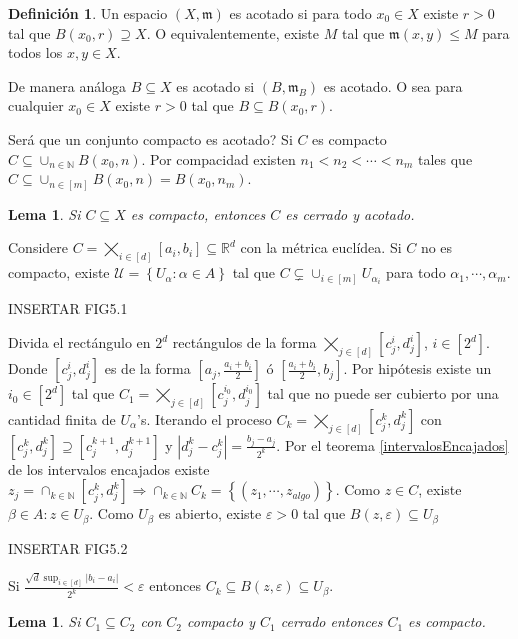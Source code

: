 \documentclass[12pt]{article}
\theoremstyle{plain}
\newtheorem{Lem}[Th]{Lema}             %
\theoremstyle{definition}
\newtheorem{Def}[Th]{Definición}       %
\theoremstyle{remark}
\numberwithin{equation}{section}
\newcommand{\bN}{\mathbb{N}}        %
\newcommand{\bR}{\mathbb{R}}        %
\newcommand{\mm}{\mathfrak{m}}      %
\newcommand{\cU}{\mathcal{U}}       %
\renewcommand{\leq}{\leqslant}      %
\renewcommand{\:}{\colon}           %
\newcommand{\conj}[1]{\left\lbrace#1\right\rbrace}
\newcommand{\bonj}[1]{\left\lbrack#1\right\rbrack}
\begin{document}
\begin{multicols}{2}
\begin{Def}
  Un espacio $(X,\mm)$ es acotado si para todo $x_0\in X$ existe $r>0$ tal que $B(x_0,r)\supseteq X$. O equivalentemente, existe $M$ tal que $\mm(x,y)\leq M$ para todos los $x,y\in X$.\par
  De manera análoga $B\subseteq X$ es acotado si $(B,\mm_B)$ es acotado. O sea para cualquier $x_0\in X$ existe $r>0$ tal que $B\subseteq B(x_0,r)$.
\end{Def}
Será que un conjunto compacto es acotado? Si $C$ es compacto $C\subseteq\cup_{n\in\bN}B(x_0,n)$. Por compacidad existen $n_1<n_2<\cdots<n_m$ tales que $C\subseteq\cup_{n\in\bonj{m}}B(x_0,n)=B(x_0,n_m)$.

\begin{Lem}
  Si $C\subseteq X$ es compacto, entonces $C$ es cerrado y acotado.
\end{Lem}

Considere $C=\bigtimes_{i\in\bonj{d}}\bonj{a_i,b_i}\subseteq\bR^d$ con la métrica euclídea. Si $C$ no es compacto, existe $\cU=\conj{U_\alpha\colon\alpha\in A}$ tal que $C\subsetneq\cup_{i\in\bonj{m}}U_{\alpha_i}$ para todo $\alpha_1,\cdots,\alpha_m$.\par
INSERTAR FIG5.1
\par
Divida el rectángulo en $2^d$ rectángulos de la forma $\bigtimes_{j\in\bonj{d}}\bonj{c^i_j,d^i_j}$, $i\in\bonj{2^d}$. Donde $\bonj{c^i_j,d^i_j}$ es de la forma $\bonj{a_j,\frac{a_i+b_i}{2}}$ ó $\bonj{\frac{a_i+b_i}{2},b_j}$. Por hipótesis existe un $i_0\in\bonj{2^d}$ tal que $C_1=\bigtimes_{j\in\bonj{d}}\bonj{c_j^{i_0},d_j^{i_0}}$ tal que no puede ser cubierto por una cantidad finita de $U_\alpha$'s.
Iterando el proceso $C_k=\bigtimes_{j\in\bonj{d}}\bonj{c_j^k,d_j^k}$ con $\bonj{c_j^k,d_j^k}\supseteq\bonj{c_j^{k+1},d_j^{k+1}}$ y $|d_j^k-c_j^k|=\frac{b_j-a_j}{2^k}$. Por el teorema \ref{intervalosEncajados} de los intervalos encajados existe $z_j=\cap_{k\in\bN}\bonj{c_j^k,d_j^k}\Rightarrow \cap_{k\in\bN}C_k=\conj{(z_1,\cdots,z_{algo})}$. Como $z\in C$, existe $\beta\in A\colon z\in U_\beta$. Como $U_\beta$ es abierto, existe $\varepsilon>0$ tal que $B(z,\varepsilon)\subseteq U_\beta$\par
INSERTAR FIG5.2
\par
Si $\frac{\sqrt{d}\sup_{i\in\bonj{d}}|b_i-a_i|}{2^k}<\varepsilon$ entonces $C_k\subseteq B(z,\varepsilon)\subseteq U_\beta$.

\begin{Lem}
  Si $C_1\subseteq C_2$ con $C_2$ compacto y $C_1$ cerrado entonces $C_1$ es compacto.
\end{Lem}


\end{multicols}
\end{document}
